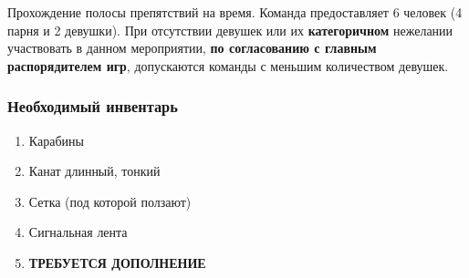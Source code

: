 
\par Прохождение полосы препятствий на время. Команда предоставляет 6 человек (4 парня и 2 девушки). При отсутствии девушек или их \textbf{категоричном} нежелании участвовать в данном мероприятии, \textbf{по согласованию с главным распорядителем игр}, допускаются команды с меньшим количеством девушек.

\subsubsection*{Необходимый инвентарь}
\begin{enumerate}
\item Карабины
\item Канат длинный, тонкий
\item Сетка (под которой ползают)
\item Сигнальная лента
\item \textbf{ТРЕБУЕТСЯ ДОПОЛНЕНИЕ}
\end{enumerate}